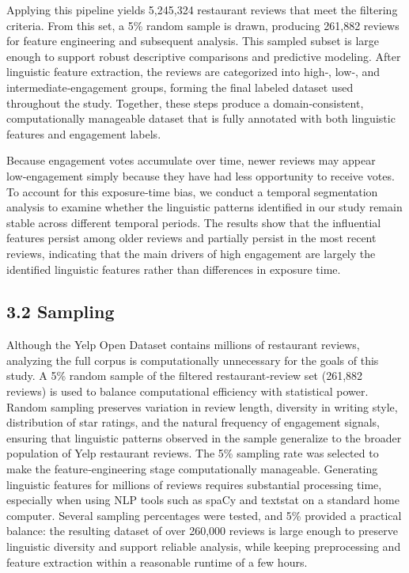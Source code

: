 \documentclass[
]{article}
\begin{document}
Applying this pipeline yields 5,245,324 restaurant reviews that meet the
filtering criteria. From this set, a 5\% random sample is drawn,
producing 261,882 reviews for feature engineering and subsequent
analysis. This sampled subset is large enough to support robust
descriptive comparisons and predictive modeling. After linguistic
feature extraction, the reviews are categorized into high‑, low‑, and
intermediate‑engagement groups, forming the final labeled dataset used
throughout the study. Together, these steps produce a domain‑consistent,
computationally manageable dataset that is fully annotated with both
linguistic features and engagement labels.

Because engagement votes accumulate over time, newer reviews may appear
low‑engagement simply because they have had less opportunity to receive
votes. To account for this exposure‑time bias, we conduct a temporal
segmentation analysis to examine whether the linguistic patterns
identified in our study remain stable across different temporal periods.
The results show that the influential features persist among older
reviews and partially persist in the most recent reviews, indicating
that the main drivers of high engagement are largely the identified
linguistic features rather than differences in exposure time.

\hypertarget{sampling}{%
\subsection{3.2 Sampling}\label{sampling}}

Although the Yelp Open Dataset contains millions of restaurant reviews,
analyzing the full corpus is computationally unnecessary for the goals
of this study. A 5\% random sample of the filtered restaurant‑review set
(261,882 reviews) is used to balance computational efficiency with
statistical power. Random sampling preserves variation in review length,
diversity in writing style, distribution of star ratings, and the
natural frequency of engagement signals, ensuring that linguistic
patterns observed in the sample generalize to the broader population of
Yelp restaurant reviews. The 5\% sampling rate was selected to make the
feature‑engineering stage computationally manageable. Generating
linguistic features for millions of reviews requires substantial
processing time, especially when using NLP tools such as spaCy and
textstat on a standard home computer. Several sampling percentages were
tested, and 5\% provided a practical balance: the resulting dataset of
over 260,000 reviews is large enough to preserve linguistic diversity
and support reliable analysis, while keeping preprocessing and feature
extraction within a reasonable runtime of a few hours.
\end{document}
